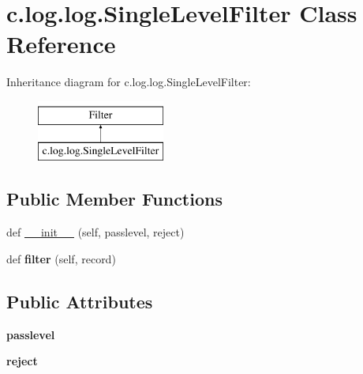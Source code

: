 \hypertarget{classc_1_1log_1_1log_1_1_single_level_filter}{}\section{c.\+log.\+log.\+Single\+Level\+Filter Class Reference}
\label{classc_1_1log_1_1log_1_1_single_level_filter}
Inheritance diagram for c.\+log.\+log.\+Single\+Level\+Filter\+:\begin{figure}[H]
\begin{center}
\leavevmode
\includegraphics[height=2.000000cm]{classc_1_1log_1_1log_1_1_single_level_filter}
\end{center}
\end{figure}
\subsection*{Public Member Functions}
\begin{DoxyCompactItemize}
\item 
def \hyperlink{classc_1_1log_1_1log_1_1_single_level_filter_a894375db5bf21af812e930490d10b75d}{\+\_\+\+\_\+init\+\_\+\+\_\+} (self, passlevel, reject)
\item 
\hypertarget{classc_1_1log_1_1log_1_1_single_level_filter_a988c08f66876dbcbdca39c0848338013}{}def {\bfseries filter} (self, record)\label{classc_1_1log_1_1log_1_1_single_level_filter_a988c08f66876dbcbdca39c0848338013}

\end{DoxyCompactItemize}
\subsection*{Public Attributes}
\begin{DoxyCompactItemize}
\item 
\hypertarget{classc_1_1log_1_1log_1_1_single_level_filter_a84cf8e865f85983c3d6a4339d085ca3d}{}{\bfseries passlevel}\label{classc_1_1log_1_1log_1_1_single_level_filter_a84cf8e865f85983c3d6a4339d085ca3d}

\item 
\hypertarget{classc_1_1log_1_1log_1_1_single_level_filter_a0c8c1c5dc15b3e1c8dd81f6133e1c88f}{}{\bfseries reject}\label{classc_1_1log_1_1log_1_1_single_level_filter_a0c8c1c5dc15b3e1c8dd81f6133e1c88f}

\end{DoxyCompactItemize}


